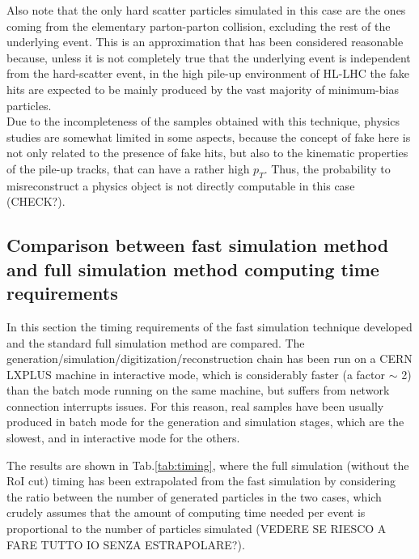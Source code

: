 \documentclass[a4paper,twoside,12pt]{article}
\begin{document}
Also note that the only hard scatter particles simulated in this case are the ones coming from
the elementary parton-parton collision, excluding the rest of the underlying event. This
is an approximation that has been considered reasonable because, unless it is not completely
true that the underlying event is independent from the hard-scatter event, in the high pile-up
environment of HL-LHC the fake hits are expected to be mainly produced by the vast majority of minimum-bias particles. \\

Due to the incompleteness of the samples obtained with this technique, physics studies are somewhat limited in some aspects, because the 
concept of fake here is not only related to the presence of fake hits, but also to the kinematic 
properties of the pile-up tracks, that can have a rather high $p_T$. Thus, the probability to misreconstruct a physics object
is not directly computable in this case (CHECK?).

\subsection{Comparison between fast simulation method and full simulation method computing time requirements}

In this section the timing requirements of the fast simulation technique developed and the
standard full simulation method are compared.
The generation/simulation/digitization/reconstruction chain has been run on a 
CERN LXPLUS machine in interactive mode, which is considerably faster (a factor $\sim$ 2) than the batch mode running on the same machine,
but suffers from network connection interrupts issues. For this reason, real samples have been  
usually produced in batch mode for the generation and simulation stages, which are the slowest, and in interactive
mode for the others.

The results are shown in Tab.\ref{tab:timing}, where the full simulation (without the
RoI cut) timing has been extrapolated from the fast simulation by considering the ratio
between the number of generated particles in the two cases, which crudely assumes that
the amount of computing time needed per event is proportional to the number of particles
simulated (VEDERE SE RIESCO A FARE TUTTO IO SENZA ESTRAPOLARE?).
\end{document}
